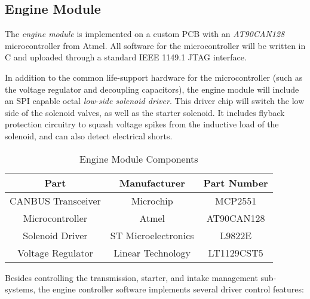 \subsection{Engine Module}
\label{sec:engine_module}

The \emph{engine module} is implemented on a custom PCB with an \emph{AT90CAN128} microcontroller from Atmel. All software for the microcontroller will be written in C and uploaded through a standard IEEE 1149.1 JTAG interface. 

In addition to the common life-support hardware for the microcontroller (such as the voltage regulator and decoupling capacitors), the engine module will include an SPI capable octal \emph{low-side solenoid driver}. This driver chip will switch the low side of the solenoid valves, as well as the starter solenoid. It includes flyback protection circuitry to squash voltage spikes from the inductive load of the solenoid, and can also detect electrical shorts. 

\begin{table}[H]
	\caption{Engine Module Components\label{tab:Engine-Module}}
	\centering
	\begin{tabular}{|c|c|c|}
		\hline 
		Part & Manufacturer & Part Number\tabularnewline 
		\hline \hline
		CANBUS Transceiver & Microchip & MCP2551\tabularnewline \hline
		Microcontroller & Atmel & AT90CAN128\tabularnewline \hline
		Solenoid Driver & ST Microelectronics & L9822E\tabularnewline \hline
		Voltage Regulator & Linear Technology & LT1129CST5\tabularnewline		
		\hline
	\end{tabular}
\end{table}

Besides controlling the transmission, starter, and intake management sub-systems, the engine controller software implements several driver control features:


